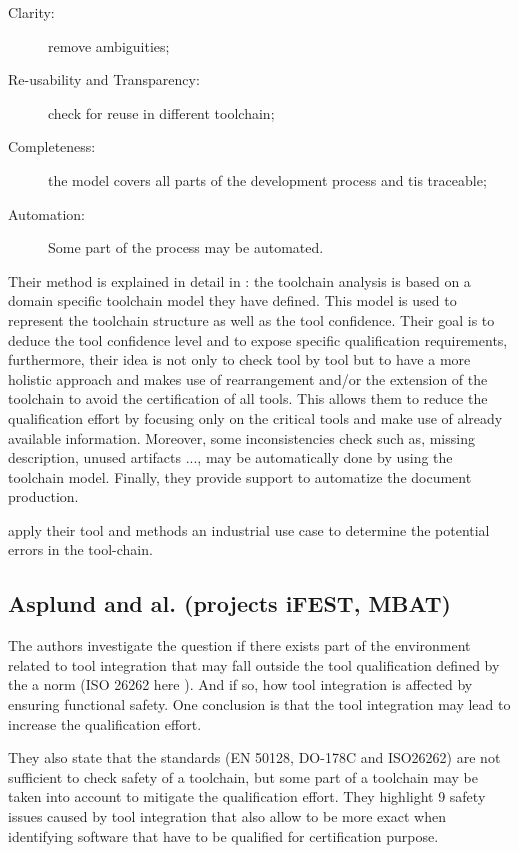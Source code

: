 \documentclass{openetcs_report}
\begin{document}
\begin{description}
\item[Clarity:] remove ambiguities;
\item[Re-usability and Transparency:] check for reuse in different toolchain;
\item[Completeness:] the model covers all parts of the  development
  process and tis traceable;
\item[Automation:] Some part of the process may be automated.
\end{description}

Their method is explained in detail in \cite{slotosch_iso_2012}: the
toolchain analysis is based on a domain specific toolchain model
they have defined. This model is used to represent the toolchain
structure as well as the tool confidence.  Their goal is to deduce the
tool confidence level and to expose specific qualification
requirements, furthermore, their idea is not only to check tool by
tool but to have a more holistic approach and makes use of
rearrangement and/or the extension of the toolchain to avoid the
certification of all tools. This allows them to reduce the
qualification effort by focusing only on the critical tools and make
use of already available information.  Moreover, some inconsistencies
check such as, missing description, unused artifacts ..., may be
automatically done by using the toolchain model. Finally, they
provide support to automatize the document production.

\cite{wildmoser_determining_2012} apply their tool and methods an
industrial use case to determine the potential errors in the tool-chain.

\subsection{Asplund and al. (projects iFEST, MBAT)}
\label{sec-1-2.2}

The authors investigate the question if there exists part of the environment related to tool
integration that may fall outside the tool qualification defined by the a norm
(ISO 26262 here \cite{asplund_qualifying_2012}). And if so, how tool integration
is affected by ensuring functional safety. One conclusion is that the tool
integration may lead to increase the qualification effort.

They also state that the standards (EN 50128, DO-178C and ISO26262)
are not sufficient to check safety of a toolchain, but some part of a
toolchain may be taken into account to mitigate the qualification
effort. 
They highlight 9 safety issues caused by tool integration that also
allow to be more exact when identifying software that have to be
qualified for certification purpose. 
\end{document}
